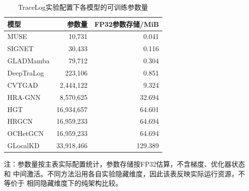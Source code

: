 \begin{table}[t]
\centering
\small
\caption{TraceLog实验配置下各模型的可训练参数量}
\label{tab:parameters_tracelog}
\begin{tabular}{lrr}
\toprule
模型 & 参数量 & FP32参数存储/MiB \\
\midrule
MUSE & 10,731 & 0.041 \\
SIGNET & 30,433 & 0.116 \\
GLADMamba & 79,712 & 0.304 \\
DeepTraLog & 223,106 & 0.851 \\
CVTGAD & 2,444,122 & 9.324 \\
HRA-GNN & 8,570,625 & 32.694 \\
HGT & 16,934,657 & 64.601 \\
HRGCN & 16,959,233 & 64.694 \\
OCHetGCN & 16,959,233 & 64.694 \\
GLocalKD & 33,918,466 & 129.389 \\
\bottomrule
\end{tabular}
\par\vspace{2pt}
\begin{minipage}{0.96\linewidth}
\scriptsize
注：参数量按主表实际配置统计，参数存储按FP32估算，不含梯度、优化器状态和
中间激活。不同方法沿用各自实验隐藏维度，因此该表反映实际运行资源，不等价于
相同隐藏维度下的纯架构比较。
\end{minipage}
\end{table}
